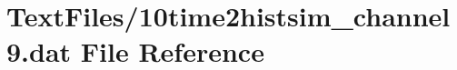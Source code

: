 \hypertarget{10time2histsim__channel9_8dat}{}\section{Text\+Files/10time2histsim\+\_\+channel9.dat File Reference}
\label{10time2histsim__channel9_8dat}
